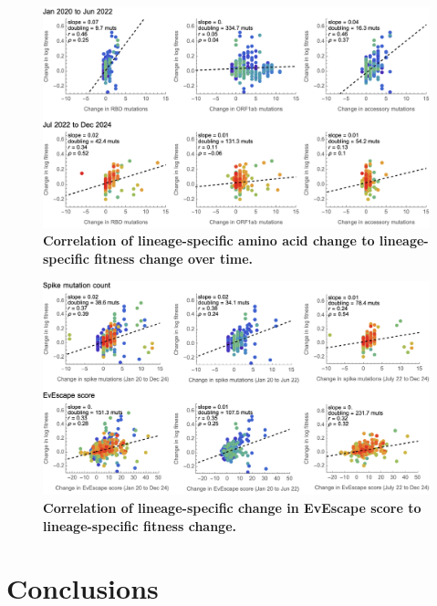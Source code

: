 \documentclass[11pt,oneside,letterpaper]{article}
\begin{document}
\begin{figure}[h]
	\centering
	\includegraphics[width=1.0\textwidth]{figures/sarscov2_lineage_delta_fitness_across_time}
	\caption{\textbf{Correlation of lineage-specific amino acid change to lineage-specific fitness change over time.}
	}
	\label{sarscov2_lineage_delta_fitness_across_time}
\end{figure}

\begin{figure}[h]
	\centering
	\includegraphics[width=1.0\textwidth]{figures/sarscov2_lineage_delta_fitness_vs_evescape}
	\caption{\textbf{Correlation of lineage-specific change in EvEscape score to lineage-specific fitness change.}
	}
	\label{sarscov2_lineage_delta_fitness_vs_evescape}
\end{figure}

\section*{Conclusions}
\end{document}
